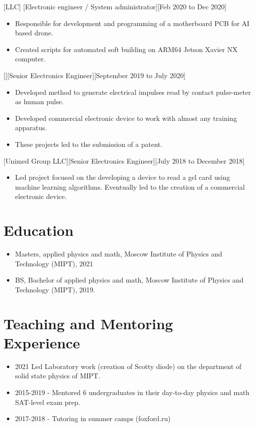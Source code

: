 \documentclass{article}
\begin{document}
[LLC]
[Electronic engineer / System administrator][Feb 2020 to Dec 2020]
 
\begin{itemize}
\item Responsible for development and programming of a motherboard PCB for AI based drone.
\item Created scripts for automated soft building on ARM64 Jetson Xavier NX computer.
\end{itemize}
 
 
[][Senior Electronics Engineer][September 2019 to July 2020]
 
\begin{itemize}
\item Developed method to generate electrical impulses read by contact pulse-meter as human pulse.
\item Developed commercial electronic device to work with almost any training apparatus.
\item These projects led to the submission of a patent.
\end{itemize}
 
[Unimed Group LLC][Senior Electronics Engineer][July 2018 to December 2018]
 
\begin{itemize}
\item Led project focused on the developing a device to read a gel card using machine learning algorithms. Eventually led to the creation of a commercial electronic device.
\end{itemize}
 
 
\section{Education}
 
\begin{itemize}
\item Masters, applied physics and math, Moscow Institute of Physics and Technology (MIPT), 2021
\item BS, Bachelor of applied physics and math, Moscow Institute of Physics and Technology (MIPT), 2019.
\end{itemize}
 
\section{Teaching and Mentoring Experience }
\begin{itemize}
\item 2021 Led Laboratory work (creation of Scotty diode) on the department of solid state physics of MIPT. 
\item 2015-2019 - Mentored 6 undergraduates in their day-to-day physics and math SAT-level exam prep.
\item 2017-2018 - Tutoring in summer camps (foxford.ru)
\end{itemize}
 
\end{document}

